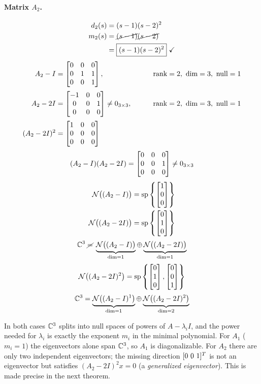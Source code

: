 \begin{example}
\paragraph{Matrix $A_2$.}
\begin{align*}
d_2(s)&=(s-1)(s-2)^2\\
m_2(s)&=\cancel{(s-1)}\cancel{(s-2)}\\
&=\boxed{(s-1)(s-2)^2}\ \checkmark
\end{align*}
\begin{alignat*}{2}
A_2-I&=\begin{bmatrix}0&0&0\\0&1&1\\0&0&1\end{bmatrix}, &\qquad&\operatorname{rank}=2,\ \dim=3,\ \text{null}=1\\[2pt]
A_2-2I&=\begin{bmatrix}-1&0&0\\0&0&1\\0&0&0\end{bmatrix}\neq 0_{3\times3}, &&\operatorname{rank}=2,\ \dim=3,\ \text{null}=1\\[2pt]
(A_2-2I)^2&=\begin{bmatrix}1&0&0\\0&0&0\\0&0&0\end{bmatrix}
\end{alignat*}
\[ (A_2-I)(A_2-2I)=\begin{bmatrix}0&0&0\\0&0&1\\0&0&0\end{bmatrix}\neq0_{3\times3} \]
\begin{align*}
\mathcal{N}\big((A_2-I)\big)&=\operatorname{sp}\left\{\begin{bmatrix}1\\0\\0\end{bmatrix}\right\}\\
\mathcal{N}\big((A_2-2I)\big)&=\operatorname{sp}\left\{\begin{bmatrix}0\\1\\0\end{bmatrix}\right\}
\end{align*}
\[
\mathbb{C}^3\;\cancel{=}\;\underbrace{\mathcal{N}\big((A_2-I)\big)}_{\dim=1}\oplus\underbrace{\mathcal{N}\big((A_2-2I)\big)}_{\dim=1}
\]
\[
\mathcal{N}\big((A_2-2I)^2\big)=\operatorname{sp}\left\{\begin{bmatrix}0\\1\\0\end{bmatrix},\begin{bmatrix}0\\0\\1\end{bmatrix}\right\}
\]
\[
\mathbb{C}^3=\underbrace{\mathcal{N}\big((A_2-I)^{1}\big)}_{\dim=1}\oplus\underbrace{\mathcal{N}\big((A_2-2I)^{2}\big)}_{\dim=2}
\]
\begin{insight}
In both cases $\mathbb{C}^3$ splits into null spaces of powers of $A-\lambda_iI$, and the power needed for $\lambda_i$ is exactly the exponent $m_i$ in the minimal polynomial. For $A_1$ ($m_i=1$) the eigenvectors alone span $\mathbb{C}^3$, so $A_1$ is diagonalizable. For $A_2$ there are only two independent eigenvectors; the missing direction $[0\ 0\ 1]^{T}$ is not an eigenvector but satisfies $(A_2-2I)^2x=0$ (a \emph{generalized eigenvector}). This is made precise in the next theorem.
\end{insight}
\end{example}
